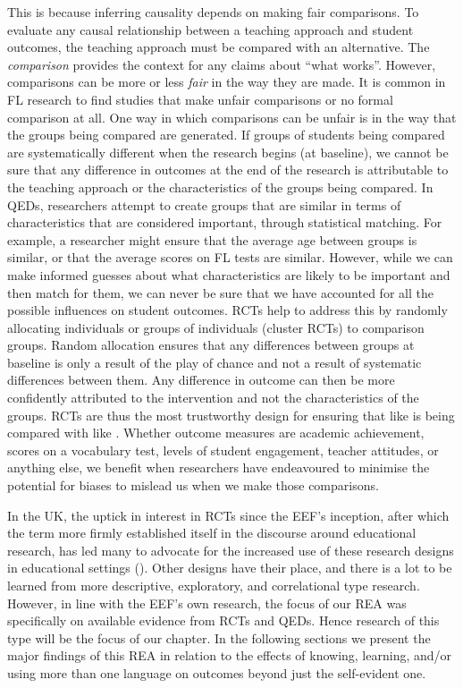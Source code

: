 \documentclass[output=paper]{langscibook}
\begin{document}
This is because inferring causality depends on making fair comparisons. To evaluate any causal relationship between a teaching approach and student outcomes, the teaching approach must be compared with an alternative. The \textit{comparison} provides the context for any claims about ``what works''. However, comparisons can be more or less \textit{fair} in the way they are made. It is common in FL research to find studies that make unfair comparisons or no formal comparison at all. One way in which comparisons can be unfair is in the way that the groups being compared are generated. If groups of students being compared are systematically different when the research begins (at baseline), we cannot be sure that any difference in outcomes at the end of the research is attributable to the teaching approach or the characteristics of the groups being compared. In QEDs, researchers attempt to create groups that are similar in terms of characteristics that are considered important, through statistical matching. For example, a researcher might ensure that the average age between groups is similar, or that the average scores on FL tests are similar. However, while we can make informed guesses about what characteristics are likely to be important and then match for them, we can never be sure that we have accounted for all the possible influences on student outcomes. RCTs help to address this by randomly allocating individuals or groups of individuals (cluster RCTs) to comparison groups. Random allocation ensures that any differences between groups at baseline is only a result of the play of chance and not a result of systematic differences between them. Any difference in outcome can then be more confidently attributed to the intervention and not the characteristics of the groups. RCTs are thus the most trustworthy design for ensuring that like is being compared with like \citep{Chalmers2018}. Whether outcome measures are academic achievement, scores on a vocabulary test, levels of student engagement, teacher attitudes, or anything else, we benefit when researchers have endeavoured to minimise the potential for biases to mislead us when we make those comparisons.

In the UK, the uptick in interest in RCTs since the EEF’s inception, after which the term more firmly established itself in the discourse around educational research, has led many to advocate for the increased use of these research designs in educational settings (\citealt{ConnellyEtAl2017,Chalmers2018}). Other designs have their place, and there is a lot to be learned from more descriptive, exploratory, and correlational type research. However, in line with the EEF’s own research, the focus of our REA was specifically on available evidence from RCTs and QEDs. Hence research of this type will be the focus of our chapter. In the following sections  we present the major findings of this REA in relation to the effects of knowing, learning, and/or using more than one language on outcomes beyond just the self-evident one.
\end{document}
